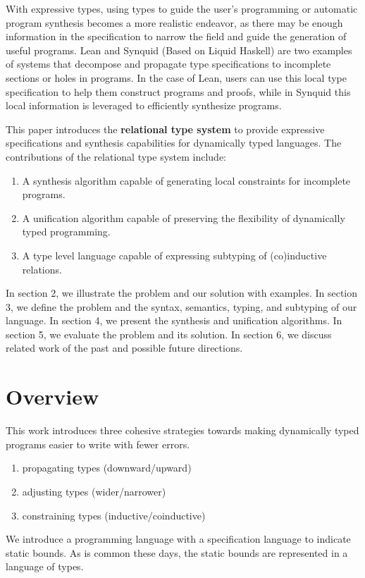 \documentclass[sigplan]{acmart}
\theoremstyle{definition}
\begin{document}
With expressive types, using types to guide the user's programming or automatic program synthesis 
becomes a more realistic endeavor, as there may be enough information in the specification to narrow the field
and guide the generation of useful programs. Lean and Synquid\cite{} (Based on Liquid Haskell) 
are two examples of systems that decompose and propagate type specifications 
to incomplete sections or holes in programs. 
In the case of Lean, users can use this local type specification to help them construct programs and proofs,
while in Synquid this local information is leveraged to efficiently synthesize programs. 

This paper introduces the \textbf{relational type system} to provide expressive specifications 
and synthesis capabilities for dynamically typed languages. 
The contributions of the relational type system include:
\begin{enumerate}
  \item A synthesis algorithm capable of generating local constraints for incomplete programs. 
  \item A unification algorithm capable of preserving the flexibility of dynamically typed programming. 
  \item A type level language capable of expressing subtyping of (co)inductive relations. 
\end{enumerate}



In section 2, we illustrate the problem and our solution with examples.
In section 3, we define the problem and the syntax, semantics, typing, and subtyping of our language.
In section 4, we present the synthesis and unification algorithms.
In section 5, we evaluate the problem and its solution. 
In section 6, we discuss related work of the past and possible future directions. 

\section{Overview}

This work introduces three cohesive strategies towards making
dynamically typed programs easier to write with fewer errors.  
\begin{enumerate}
  \item propagating types (downward/upward) 
  \item adjusting types (wider/narrower) 
  \item constraining types (inductive/coinductive) 
\end{enumerate}
We introduce a programming language with a specification language to indicate static bounds. 
As is common these days, the static bounds are represented in a language of types.
\end{document}
